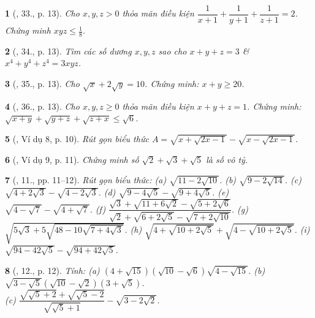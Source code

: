 \documentclass{article}
\newtheorem{baitoan}{}%
\begin{document}
\begin{baitoan}[\cite{Tuyen_Toan_9_old}, 33., p. 13]
	Cho $x,y,z > 0$ thỏa mãn điều kiện $\dfrac{1}{x + 1} + \dfrac{1}{y + 1} + \dfrac{1}{z + 1} = 2$. Chứng minh $xyz\le\frac{1}{8}$.
\end{baitoan}

\begin{baitoan}[\cite{Tuyen_Toan_9_old}, 34., p. 13]
	Tìm các số dương $x,y,z$ sao cho $x + y + z = 3$ \& $x^4 + y^4 + z^4 = 3xyz$.
\end{baitoan}

\begin{baitoan}[\cite{Tuyen_Toan_9_old}, 35., p. 13]
	Cho $\sqrt{x} + 2\sqrt{y} = 10$. Chứng minh: $x + y\ge20$.
\end{baitoan}

\begin{baitoan}[\cite{Tuyen_Toan_9_old}, 36., p. 13]
	Cho $x,y,z\ge0$ thỏa mãn điều kiện $x + y + z = 1$. Chứng minh: $\sqrt{x + y} + \sqrt{y + z} + \sqrt{z + x}\le\sqrt{6}$.
\end{baitoan}

\begin{baitoan}[\cite{Binh_Toan_9_tap_1}, Ví dụ 8, p. 10]
	Rút gọn biểu thức $A = \sqrt{x + \sqrt{2x - 1}} - \sqrt{ x - \sqrt{2x - 1}}$.
\end{baitoan}

\begin{baitoan}[\cite{Binh_Toan_9_tap_1}, Ví dụ 9, p. 11]
	Chứng minh số $\sqrt{2} + \sqrt{3} + \sqrt{5}$ là số vô tỷ.
\end{baitoan}

\begin{baitoan}[\cite{Binh_Toan_9_tap_1}, 11., pp. 11--12]
	Rút gọn biểu thức: (a) $\sqrt{11 - 2\sqrt{10}}$. (b) $\sqrt{9 - 2\sqrt{14}}$. (c) $\sqrt{4 + 2\sqrt{3}} - \sqrt{4 - 2\sqrt{3}}$. (d) $\sqrt{9 - 4\sqrt{5}} - \sqrt{9 + 4\sqrt{5}}$. (e) $\sqrt{4 - \sqrt{7}} - \sqrt{4 + \sqrt{7}}$. (f) $\dfrac{\sqrt{3} + \sqrt{11 + 6\sqrt{2}}- \sqrt{5 + 2\sqrt{6}}}{\sqrt{2} + \sqrt{6 + 2\sqrt{5}} - \sqrt{7 + 2\sqrt{10}}}$. (g) $\sqrt{5\sqrt{3} + 5\sqrt{48 - 10\sqrt{7+ 4\sqrt{3}}}}$. (h) $\sqrt{4 + \sqrt{10 + 2\sqrt{5}}} + \sqrt{4 - \sqrt{10 + 2\sqrt{5}}}$. (i) $\sqrt{94 - 42\sqrt{5}} - \sqrt{94 + 42\sqrt{5}}$.
\end{baitoan}

\begin{baitoan}[\cite{Binh_Toan_9_tap_1}, 12., p. 12]
	Tính: (a) $(4 + \sqrt{15})(\sqrt{10} - \sqrt{6})\sqrt{4 - \sqrt{15}}$. (b) $\sqrt{3 - \sqrt{5}}(\sqrt{10} - \sqrt{2})(3 + \sqrt{5})$.\\(c) $\dfrac{\sqrt{\sqrt{5} + 2} + \sqrt{\sqrt{5} - 2}}{\sqrt{\sqrt{5} + 1}} - \sqrt{3 - 2\sqrt{2}}$.
\end{baitoan}
\end{document}
